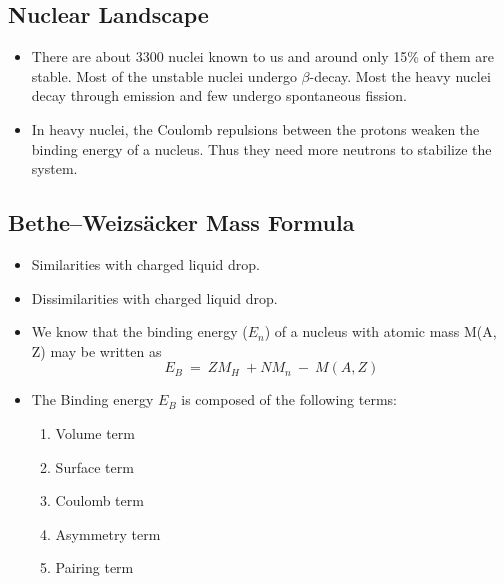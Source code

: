 \documentclass[ebook,12pt,oneside,openany]{memoir}
\begin{document}
        \subsection{Nuclear Landscape}
            \begin{itemize}
                \item There are about 3300 nuclei known to us and around only 15\% of them are stable. Most of the unstable nuclei undergo $\beta$-decay. Most the heavy nuclei decay through  emission and few undergo spontaneous fission.
                \item In heavy nuclei, the Coulomb repulsions between the protons weaken the binding energy of a nucleus. Thus they need more neutrons to stabilize the system.
            \end{itemize}
        \subsection{Bethe–Weizsäcker Mass Formula}
            \begin{itemize}
                \item Similarities with charged liquid drop.
                \item Dissimilarities with charged liquid drop.
                \item We know that the binding energy ($E_n$) of a nucleus with atomic mass M(A, Z) may be written as \[E_B ~=~ZM_H~+NM_n~-~M(A, Z)\]
                \item The Binding energy $E_B$ is composed of the following terms:
                    \begin{enumerate}[label=\textbf{\alph*.}]
                        \item Volume term
                        \item Surface term
                        \item Coulomb term
                        \item Asymmetry term
                        \item Pairing term
                    \end{enumerate}
            \end{itemize}
\end{document}
